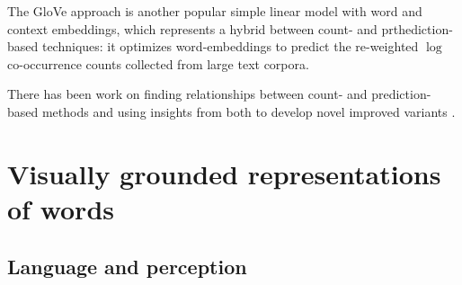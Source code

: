 The GloVe approach \citep{pennington2014glove} is another popular simple linear model
with word  and context embeddings, which
represents a hybrid between count- and prthediction-based techniques:
it optimizes word-embeddings to predict the re-weighted
$\log$ co-occurrence counts collected from large text corpora.




There has been work on finding relationships between
count- and prediction-based methods \citep{levy2014neural} and
using insights from both to develop novel improved
variants \citep{levy2015improving}.





\section{Visually grounded representations of words}
\label{sec:visualwords}

\subsection{Language and perception}
\label{sec:langperc}

